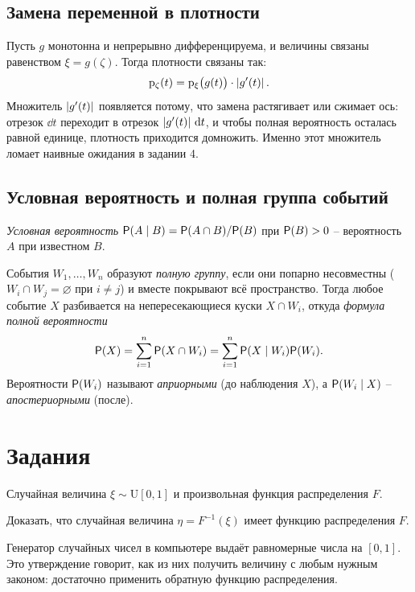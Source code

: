 \documentclass[12pt,a4paper]{article}
\begin{document}
\subsection{Замена переменной в плотности}

Пусть $g$ монотонна и непрерывно дифференцируема, и величины связаны равенством
$\xi = g(\zeta)$. Тогда плотности связаны так:
\begin{equation}\label{eq:jac}
  \mathrm{p}_\zeta(t) = \mathrm{p}_\xi\bigl(g(t)\bigr)\cdot\left\lvert g'(t) \right\rvert .
\end{equation}
Множитель $\left\lvert g'(t) \right\rvert$ появляется потому, что замена растягивает или сжимает
ось: отрезок $\dd t$ переходит в отрезок $\left\lvert g'(t) \right\rvert\,\mathrm{d} t$, и чтобы полная
вероятность осталась равной единице, плотность приходится домножить. Именно этот
множитель ломает наивные ожидания в задании 4.

\subsection{Условная вероятность и полная группа событий}

\emph{Условная вероятность} $\mathsf{P}(A \mid B) = \mathsf{P}(A \cap B)/\mathsf{P}(B)$ при
$\mathsf{P}(B) > 0$ -- вероятность $A$ при известном $B$.

События $W_1,\dots,W_n$ образуют \emph{полную группу}, если они попарно
несовместны ($W_i \cap W_j = \varnothing$ при $i \ne j$) и вместе покрывают всё
пространство. Тогда любое событие $X$ разбивается на непересекающиеся куски
$X \cap W_i$, откуда \emph{формула полной вероятности}
\begin{equation}\label{eq:total}
  \mathsf{P}(X) = \sum_{i=1}^{n}\mathsf{P}(X \cap W_i) = \sum_{i=1}^{n}\mathsf{P}(X \mid W_i)\mathsf{P}(W_i).
\end{equation}
Вероятности $\mathsf{P}(W_i)$ называют \emph{априорными} (до наблюдения $X$), а
$\mathsf{P}(W_i \mid X)$ -- \emph{апостериорными} (после).

\section{Задания}

\dano Случайная величина $\xi \sim \mathrm{U}[0,1]$ и произвольная функция
распределения $F$.

\treb Доказать, что случайная величина $\eta = F^{-1}(\xi)$ имеет функцию
распределения $F$.

\zachem Генератор случайных чисел в компьютере выдаёт равномерные числа на
$[0,1]$. Это утверждение говорит, как из них получить величину с любым нужным
законом: достаточно применить обратную функцию распределения.
\end{document}
